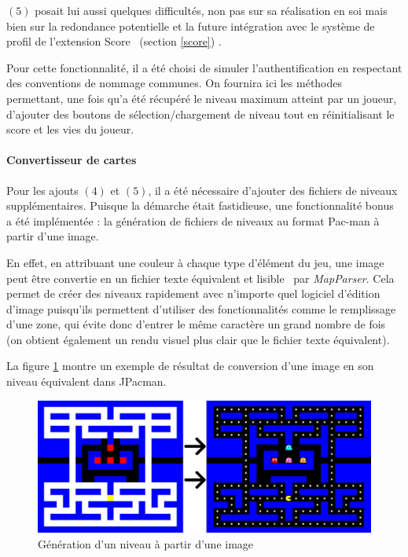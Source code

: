 \documentclass[12pt, openany]{report}
\begin{document}
$(5)$ posait lui aussi quelques difficultés, non pas sur sa réalisation en soi mais bien sur la redondance potentielle et la future intégration avec le système de profil de l'extension \og Score \fg \, (section \ref{score}) . 

Pour cette fonctionnalité, il a été choisi de simuler l'authentification en respectant des conventions de nommage communes. On fournira ici les méthodes permettant, une fois qu'a été récupéré le niveau maximum atteint par un joueur, d'ajouter des boutons de sélection/chargement de niveau tout en réinitialisant le score et les vies du joueur.

\paragraph{Convertisseur de cartes} \label{map_generator_txt}
Pour les ajouts $(4)$ et $(5)$, il a été nécessaire d'ajouter des fichiers de niveaux supplémentaires. Puisque la démarche était fastidieuse, une fonctionnalité \og bonus \fg \, a été implémentée : la génération de fichiers de niveaux au format Pac-man à partir d'une image.

En effet, en attribuant une couleur à chaque type d'élément du jeu,  une image peut être convertie en un fichier texte équivalent et \og lisible \fg \, par \mbox{\textit{MapParser}}. Cela permet de créer des niveaux rapidement avec n'importe quel logiciel d'édition d'image puisqu'ils permettent d'utiliser des fonctionnalités comme le \og remplissage \fg d'une zone, qui évite donc d'entrer le même caractère un grand nombre de fois (on obtient également un rendu visuel plus clair que le fichier texte équivalent). 

La figure \ref{map_generator_img} montre un exemple de résultat de conversion d'une image en son niveau équivalent dans JPacman.
\begin{figure}[h]
	\centering
	\includegraphics[width=13cm]{Images/mapgenerator.jpg}
	\caption{\label{map_generator_img} Génération d'un niveau à partir d'une image}
\end{figure}
\end{document}
